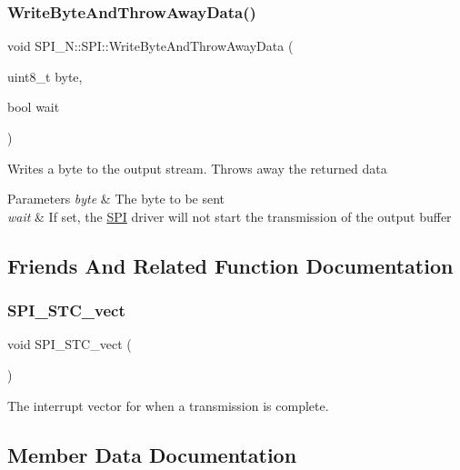 \subsubsection{\texorpdfstring{Write\+Byte\+And\+Throw\+Away\+Data()}{WriteByteAndThrowAwayData()}}
{\footnotesize\ttfamily void S\+P\+I\+\_\+\+N\+::\+S\+P\+I\+::\+Write\+Byte\+And\+Throw\+Away\+Data (\begin{DoxyParamCaption}\item[{uint8\+\_\+t}]{byte,  }\item[{bool}]{wait }\end{DoxyParamCaption})}

Writes a byte to the output stream. Throws away the returned data 
\begin{DoxyParams}{Parameters}
{\em byte} & The byte to be sent \\
\hline
{\em wait} & If set, the \hyperlink{class_s_p_i___n_1_1_s_p_i}{S\+PI} driver will not start the transmission of the output buffer \\
\hline
\end{DoxyParams}


\subsection{Friends And Related Function Documentation}
\hypertarget{class_s_p_i___n_1_1_s_p_i_a96543550133e0b0c6ae83faad5c0d68d}{}\label{class_s_p_i___n_1_1_s_p_i_a96543550133e0b0c6ae83faad5c0d68d} 
\subsubsection{\texorpdfstring{S\+P\+I\+\_\+\+S\+T\+C\+\_\+vect}{SPI\_STC\_vect}}
{\footnotesize\ttfamily void S\+P\+I\+\_\+\+S\+T\+C\+\_\+vect (\begin{DoxyParamCaption}{ }\end{DoxyParamCaption})\hspace{0.3cm}{\ttfamily [friend]}}

The interrupt vector for when a transmission is complete. 

\subsection{Member Data Documentation}
\hypertarget{class_s_p_i___n_1_1_s_p_i_ac016c4eaed2db3f8b5523bf0d472ddd2}{}\label{class_s_p_i___n_1_1_s_p_i_ac016c4eaed2db3f8b5523bf0d472ddd2} 

